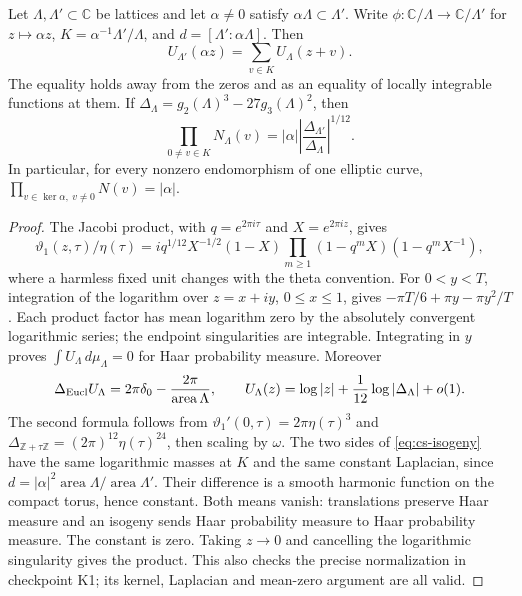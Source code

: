 \begin{statement}
Let $\Lambda,\Lambda'\subset\mathbb C$ be lattices and let
$\alpha\ne0$ satisfy $\alpha\Lambda\subset\Lambda'$. Write
$\phi:\mathbb C/\Lambda\to\mathbb C/\Lambda'$ for $z\mapsto\alpha z$,
$K=\alpha^{-1}\Lambda'/\Lambda$, and
$d=[\Lambda':\alpha\Lambda]$. Then
\begin{equation}\label{eq:cs-isogeny}
 U_{\Lambda'}(\alpha z)=\sum_{v\in K}U_\Lambda(z+v).
\end{equation}
The equality holds away from the zeros and as an equality of locally
integrable functions at them. If $\Delta_\Lambda=g_2(\Lambda)^3-
27g_3(\Lambda)^2$, then
\[
 \prod_{0\ne v\in K}N_\Lambda(v)
 =|\alpha|\left|\frac{\Delta_{\Lambda'}}{\Delta_\Lambda}\right|^{1/12}.
\]
In particular, for every nonzero endomorphism of one elliptic curve,
$\prod_{v\in\ker\alpha,\ v\ne0}N(v)=|\alpha|$.
\end{statement}
\begin{proof}
The Jacobi product, with $q=e^{2\pi i\tau}$ and
$X=e^{2\pi iz}$, gives
\[
 \vartheta _1(z,\tau)/\eta(\tau)
 =i q^{1/12}X^{-1/2}(1-X)
     \prod_{m\ge1}(1-q^mX)(1-q^mX^{-1}),
\]
where a harmless fixed unit changes with the theta convention. For
$0<y<T$, integration of the logarithm over $z=x+iy$, $0\le x\le1$,
gives $-\pi T/6+\pi y-\pi y^2/T$. Each product factor has mean logarithm
zero by the absolutely convergent logarithmic series; the endpoint
singularities are integrable. Integrating in $y$ proves
$\int U_\Lambda\,d\mu_\Lambda=0$ for Haar probability measure.
Moreover
\[
 \Delta_{\rm Eucl}U_\Lambda
   =2\pi\delta_0-\frac{2\pi}{\operatorname{area}\Lambda},\qquad
 U_\Lambda(z)=\log|z|+\frac1{12}\log|\Delta_\Lambda|+o(1).
\]
The second formula follows from
$\vartheta _1'(0,\tau)=2\pi\eta(\tau)^3$ and
$\Delta_{\mathbb Z+\tau\mathbb Z}=(2\pi)^{12}\eta(\tau)^{24}$,
then scaling by $\omega$. The two sides of
\eqref{eq:cs-isogeny} have the same logarithmic masses at $K$ and the
same constant Laplacian, since
$d=|\alpha|^2\operatorname{area}\Lambda/
\operatorname{area}\Lambda'$. Their difference is a smooth harmonic
function on the compact torus, hence constant. Both means vanish:
translations preserve Haar measure and an isogeny sends Haar
probability measure to Haar probability measure. The constant is zero.
Taking $z\to0$ and cancelling the logarithmic singularity gives the
product. This also checks the precise normalization in checkpoint K1;
its kernel, Laplacian and mean-zero argument are all valid.
\end{proof}
